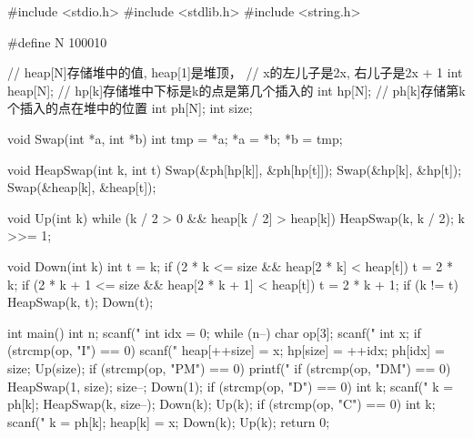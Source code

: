 \begin{mycpptwocol}[可修改任意元素的堆]
    #include <stdio.h>
    #include <stdlib.h>
    #include <string.h>

    #define N 100010

    // heap[N]存储堆中的值, heap[1]是堆顶，
    // x的左儿子是2x, 右儿子是2x + 1
    int heap[N];
    // hp[k]存储堆中下标是k的点是第几个插入的
    int hp[N];
    // ph[k]存储第k个插入的点在堆中的位置
    int ph[N];
    int size;

    void Swap(int *a, int *b) {
        int tmp = *a;
        *a = *b;
        *b = tmp;
    }

    void HeapSwap(int k, int t) {
        Swap(&ph[hp[k]], &ph[hp[t]]);
        Swap(&hp[k], &hp[t]);
        Swap(&heap[k], &heap[t]);
    }

    void Up(int k) {
        while (k / 2 > 0 &&
        heap[k / 2] > heap[k]) {
            HeapSwap(k, k / 2);
            k >>= 1;
        }
    }

    void Down(int k) {
        int t = k;
        if (2 * k <= size &&
        heap[2 * k] < heap[t]) {
            t = 2 * k;
        }
        if (2 * k + 1 <= size &&
        heap[2 * k + 1] < heap[t]) {
            t = 2 * k + 1;
        }
        if (k != t) {
            HeapSwap(k, t);
            Down(t);
        }
    }

    int main() {
        int n;
        scanf("%
        int idx = 0;
        while (n--) {
            char op[3];
            scanf("%
            int x;
            if (strcmp(op, "I") == 0) {
                scanf("%
                heap[++size] = x;
                hp[size] = ++idx;
                ph[idx] = size;
                Up(size);
            }
            if (strcmp(op, "PM") == 0) {
                printf("%
            }
            if (strcmp(op, "DM") == 0) {
                HeapSwap(1, size);
                size--;
                Down(1);
            }
            if (strcmp(op, "D") == 0) {
                int k;
                scanf("%
                k = ph[k];
                HeapSwap(k, size--);
                Down(k);
                Up(k);
            }
            if (strcmp(op, "C") == 0) {
                int k;
                scanf("%
                k = ph[k];
                heap[k] = x;
                Down(k);
                Up(k);
            }
        }
        return 0;
    }
\end{mycpptwocol}


